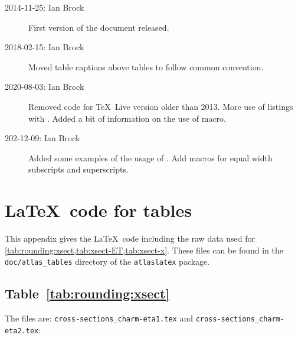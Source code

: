 \documentclass[REPORT=false, UKenglish]{atlasdoc}
\begin{document}
\begin{description}
\item[2014-11-25: Ian Brock] First version of the document released.
\item[2018-02-15: Ian Brock] Moved table captions above tables to follow common convention.
\item[2020-08-03: Ian Brock] Removed code for \TeX\ Live version older than 2013.
  More use of listings with .
  Added a bit of information on the use of  macro.
\item[202-12-09: Ian Brock] Added some examples of the usage of .
  Add macros for equal width subscripts and superscripts. 
\end{description}


\printbibliography
% 
% 

\clearpage
\appendix
\section{\LaTeX\ code for tables}
\label{sec:raw-data}

This appendix gives the \LaTeX\ code including the raw data used for
\cref{tab:rounding:xsect,tab:xsect-ET,tab:xsect-x}.
These files can be found in the \texttt{doc/atlas\_tables} directory
of the \texttt{atlaslatex} package.

\subsection{Table~\protect\ref{tab:rounding:xsect}}

The files are: \texttt{cross-sections\_charm-eta1.tex} and
\texttt{cross-sections\_charm-eta2.tex}:


\end{document}
